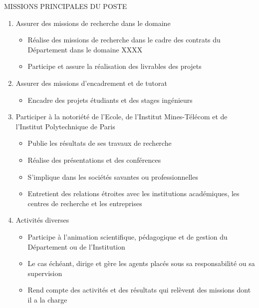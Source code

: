 \begin{graybox}{MISSIONS PRINCIPALES DU POSTE}


\begin{enumerate}
    \item Assurer des missions de recherche dans le domaine  \textbf{\subtask{}}
        \begin {itemize}
            \item	Réalise des missions de recherche dans le cadre des contrats du Département dans le domaine XXXX
            \item	Participe et assure la réalisation des livrables des projets

        \end{itemize}

    \item Assurer des missions d’encadrement et de tutorat
        \begin{itemize}
            \item     Encadre des projets étudiants et des stages ingénieurs
        \end{itemize}

    \item Participer à la notoriété de l’Ecole, de l’Institut Mines-Télécom et de l’Institut Polytechnique de Paris 
    
        \begin{itemize}
            \item Publie les résultats de ses travaux de recherche
            \item Réalise des présentations et des conférences
            \item S’implique dans les sociétés savantes ou professionnelles
            \item Entretient des relations étroites avec les institutions académiques, les centres de recherche et les entreprises

        
        \end{itemize}

    \item Activités diverses
    
        \begin{itemize}
            \item  Participe à l’animation scientifique, pédagogique et de gestion du Département ou de l’Institution
            \item  Le cas échéant, dirige et gère les agents placés sous sa responsabilité ou sa supervision
            \item  Rend compte des activités et des résultats qui relèvent des missions dont il a la charge

\end{itemize}


\end{enumerate}



\end{graybox}



